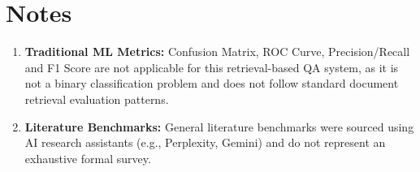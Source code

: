 \documentclass[conference]{IEEEtran}
\begin{document}
\section*{Notes}
\begin{enumerate}
    \item \textbf{Traditional ML Metrics:} Confusion Matrix, ROC Curve, Precision/Recall and F1 Score are not applicable for this retrieval-based QA system, as it is not a binary classification problem and does not follow standard document retrieval evaluation patterns.
    
    \item \textbf{Literature Benchmarks:} General literature benchmarks were sourced using AI research assistants (e.g., Perplexity, Gemini) and do not represent an exhaustive formal survey.
\end{enumerate}
\end{document}
